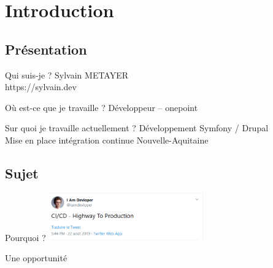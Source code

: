 \section{Introduction}

\subsection{Présentation}

\begin{frame}{\subsecname}
	\begin{block}{Qui suis-je ?}
	Sylvain METAYER \\ 
	https://sylvain.dev
	\end{block}
	\pause
	\begin{block}{Où est-ce que je travaille ?}
	Développeur -- onepoint
	\end{block}
	\pause
	\begin{block}{Sur quoi je travaille actuellement ?}
	Développement Symfony / Drupal\\ 	
	Mise en place intégration continue Nouvelle-Aquitaine
	\end{block}
\end{frame}

\subsection{Sujet}
\begin{frame}{\subsecname}
	 \begin{overprint}
			\begin{block}{Pourquoi ?}
			\centering \includegraphics[width=0.5\textwidth]{img/highway-ci.png}
			\end{block}
			\begin{block}{Une opportunité}
			\end{block}
	\end{overprint} 
\end{frame}
